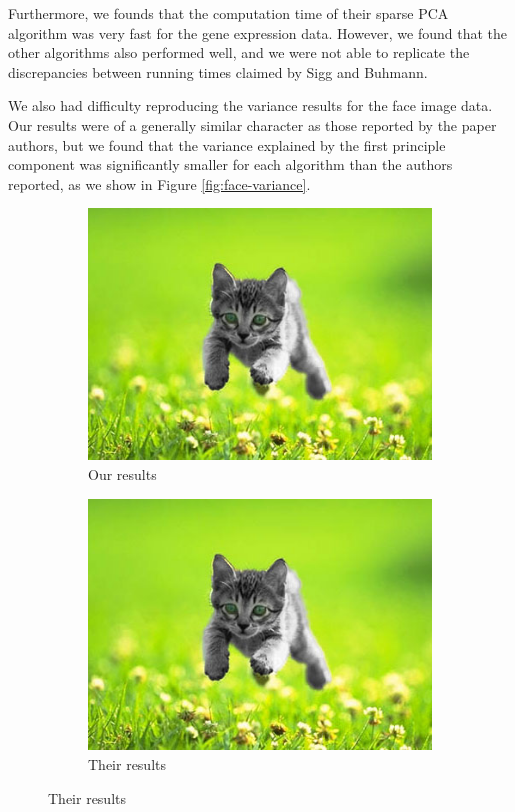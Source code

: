 \documentclass[twocolumn]{article}
\begin{document}
Furthermore, we founds that the computation time of their sparse
PCA algorithm was very fast for the gene expression data.
However, we found that the other algorithms also performed well,
and we were not able to replicate the discrepancies between
running times claimed by Sigg and Buhmann.

We also had difficulty reproducing the variance results for the
face image data. Our results were of a generally similar character
as those reported by the paper authors, but we found that the variance
explained by the first principle component was significantly smaller
for each algorithm than the authors reported, as we show
in Figure \ref{fig:face-variance}.

\begin{figure}[H,width=\textwidth]
\caption{Variance versus cardinality for face data}
\label{fig:face-variance}
\begin{subfigure}{0.5\textwidth}
\caption{Our results}
\includegraphics[width=\textwidth]{kitten.jpg}
\end{subfigure}
\begin{subfigure}{0.5\textwidth}
\caption{Their results}
\includegraphics[width=\textwidth]{kitten.jpg}
\end{subfigure}
\end{figure}
\end{document}

